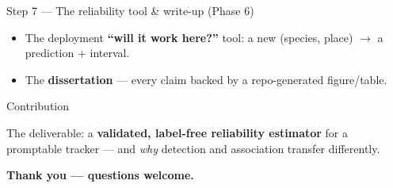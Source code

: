 \documentclass[aspectratio=169,11pt]{beamer}
\begin{document}
\begin{frame}{Step 7 --- The reliability tool \& write-up \small(Phase 6)}
  \centering
  \vspace{0.5em}
  \begin{itemize}\footnotesize
    \item The deployment \textbf{``will it work here?''} tool: a new (species, place) $\to$ a prediction $+$ interval.
    \item The \textbf{dissertation} --- every claim backed by a repo-generated figure/table.
  \end{itemize}
\end{frame}

\begin{frame}{Contribution}
  \begin{block}{}
    \centering The deliverable: a \textbf{validated, label-free reliability estimator} for a promptable
    tracker --- and \emph{why} detection and association transfer differently.
  \end{block}
  \vspace{0.6em}
  \centering\small\color{navy}\textbf{Thank you --- questions welcome.}
\end{frame}
\end{document}
